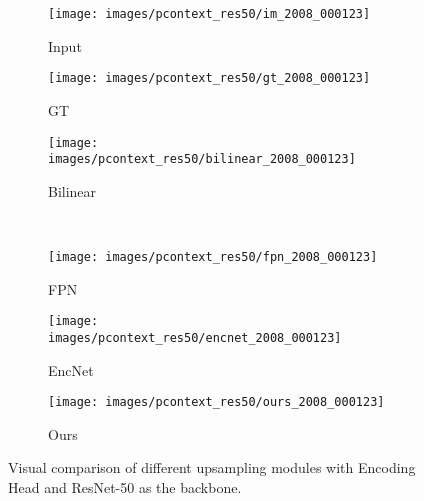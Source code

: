 \documentclass[10pt,twocolumn,letterpaper]{article}
\begin{document}
\begin{figure} 
\begin{center}
	\begin{subfigure}[b]{0.32\linewidth}
		\texttt{[image: images/pcontext\_res50/im\_2008\_000123]}
      	\caption{Input}
      	\label{fig:pcontext_res50:input}
    \end{subfigure}
    \hfill
	\begin{subfigure}[b]{0.32\linewidth}
		\texttt{[image: images/pcontext\_res50/gt\_2008\_000123]}
      	\caption{GT}
      	\label{fig:pcontext_res50:gt}
    \end{subfigure}
	\hfill
	\begin{subfigure}[b]{0.32\linewidth}
		\texttt{[image: images/pcontext\_res50/bilinear\_2008\_000123]}
      	\caption{Bilinear}
      	\label{fig:pcontext_res50:bilinear}
    \end{subfigure}\\
    \begin{subfigure}[b]{0.32\linewidth}
		\texttt{[image: images/pcontext\_res50/fpn\_2008\_000123]}
      	\caption{FPN~\cite{lin2017feature}}
      	\label{fig:pcontext_res50:fpn}
    \end{subfigure}
    \hfill
	\begin{subfigure}[b]{0.32\linewidth}
		\texttt{[image: images/pcontext\_res50/encnet\_2008\_000123]}
      	\caption{EncNet~\cite{zhang2018context}}
      	\label{fig:pcontext_res50:encnet}
    \end{subfigure}
	\hfill
	\begin{subfigure}[b]{0.32\linewidth}
		\texttt{[image: images/pcontext\_res50/ours\_2008\_000123]}
      	\caption{Ours}
      	\label{fig:pcontext_res50:ours}
    \end{subfigure}
\end{center}
	\caption{Visual comparison of different upsampling modules with Encoding Head and ResNet-50 as the backbone.}
	\label{fig:pcontext_res50}
\end{figure}
\end{document}
